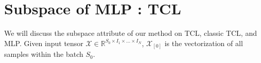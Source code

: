\documentclass{article}
\begin{document}
%	

\section{Subspace of MLP : TCL}
\label{subspace-tcl}

We will discuss the subspace attribute of our method on TCL, classic TCL, and MLP. Given input tensor $\mathcal{X} \in \mathbb{R}^{S_0\times I_1\times\dots\times I_N}$, $\mathcal{X}_{[0]}$ is the vectorization of all samples within the batch $S_0$.
\end{document}
